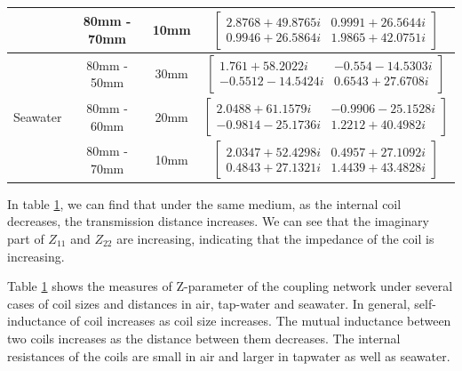 \begin{table}[!t]
{\begin{tabular}{|c|c|c|c|}
                                   & 80mm - 70mm                        & 10mm              & $\begin{bmatrix} 2.8768	+49.8765i & 0.9991	+26.5644i \\
                0.9946	+26.5864i & 1.9865	+42.0751i\end{bmatrix}$ \Tstrut\Bstrut\\ \hline
        \multirow{3}{*}{Seawater}  & 80mm - 50mm                        & 30mm              & $\begin{bmatrix} 1.761	+58.2022i   & -0.554	-14.5303i \\
                -0.5512	-14.5424i & 0.6543	+27.6708i\end{bmatrix}$ \Tstrut\Bstrut\\ \cline{2-4}
                                   & 80mm - 60mm                        & 20mm              & $\begin{bmatrix} 2.0488	+61.1579i  & -0.9906	-25.1528i \\
                -0.9814	-25.1736i & 1.2212	+40.4982i\end{bmatrix}$ \Tstrut\Bstrut\\ \cline{2-4}
                                   & 80mm - 70mm                        & 10mm              & $\begin{bmatrix} 2.0347	+52.4298i & 0.4957	+27.1092i \\
                0.4843	+27.1321i & 1.4439	+43.4828i\end{bmatrix}$ \Tstrut\Bstrut\\ \hline
    \end{tabular}
    }
    \renewcommand{\arraystretch}{1}
    \label{table:Z-parameters in distance}
\end{table}


In table \ref{table:Z-parameters in distance}, we can find that under the same medium, as the internal coil decreases, the transmission distance increases. We can see that the imaginary part of $Z_{11}$ and $Z_{22}$ are increasing, indicating that the impedance of the coil is increasing.

Table \ref{table:Z-parameters in distance} shows the measures of Z-parameter of the coupling network under several cases of coil sizes and distances in air, tap-water and seawater.
In general, self-inductance of coil increases as coil size increases.
The mutual inductance between two coils increases as the distance between them decreases.
The internal resistances of the coils are small in air and larger in tapwater as well as seawater.

